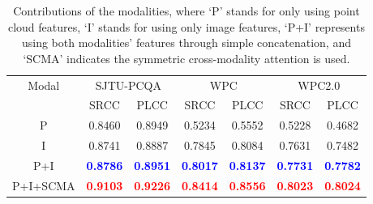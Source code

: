 \documentclass{article}
\begin{document}
\begin{table}[tb]\small
\renewcommand\tabcolsep{2.8pt}
    \centering
     
    \begin{tabular}{c|cc|cc|cc} 
    \toprule
    \multirow{2}{*}{Modal}  & \multicolumn{2}{c|}{SJTU-PCQA} & \multicolumn{2}{c|}{WPC} & \multicolumn{2}{c}{WPC2.0} \\ \cline{2-7}
            & SRCC    & PLCC   & SRCC   & PLCC & SRCC   & PLCC \\ \hline
        P         &0.8460 &0.8949 & 0.5234 & 0.5552 & 0.5228 & 0.4682\\
        I         &0.8741 &0.8887 & 0.7845 & 0.8084 & 0.7631 & 0.7482\\ 
        P+I       &\bf\textcolor{blue}{0.8786} &\bf\textcolor{blue}{0.8951} & \bf\textcolor{blue}{0.8017} & \bf\textcolor{blue}{0.8137} &\bf\textcolor{blue}{0.7731} & \bf\textcolor{blue}{0.7782} \\
        P+I+SCMA   & \bf\textcolor{red}{0.9103}   & \bf\textcolor{red}{0.9226}    &\bf\textcolor{red}{0.8414}    & \bf\textcolor{red}{0.8556}     &\bf\textcolor{red}{0.8023}    & \bf\textcolor{red}{0.8024}     \\     
    \bottomrule
    \end{tabular}
   \caption{Contributions of the modalities, where `P' stands for only using point cloud features, `I' stands for using only image features, `P+I' represents using both modalities' features through simple concatenation, and `SCMA' indicates the symmetric cross-modality attention is used. }
    \label{tab:modality}
    \vspace{-0.2cm}
\end{table}
\end{document}
